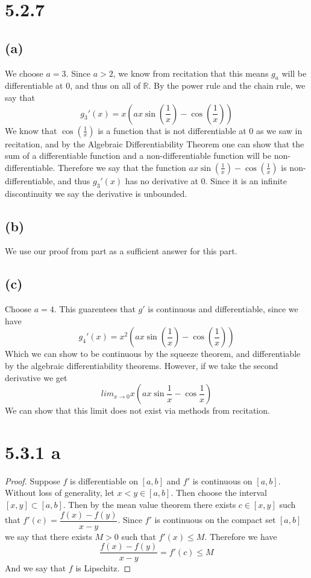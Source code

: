 \documentclass{article}
\begin{document}
\section*{5.2.7}
\subsection*{(a)}
We choose $a =3$. Since $a >2$, we know from recitation that this means $g_a$ will be differentiable at 0, and thus on all of $\mathbb{R}$. By the power rule and the chain rule, we say that 
\[ g_3'(x) = x \left(ax \sin\left(\frac{1}{x}\right) - \cos\left(\frac{1}{x}\right)\right)\]
We know that $\cos\left(\frac{1}{x}\right)$ is a function that is not differentiable at 0 as we saw in recitation, and by the Algebraic Differentiability Theorem one can show that the sum of a differentiable function and a non-differentiable function will be non-differentiable. Therefore we say that the function $ax \sin\left(\frac{1}{x}\right) - \cos\left(\frac{1}{x}\right)$ is non-differentiable, and thus $g_3'(x)$ has no derivative at 0. Since it is an infinite discontinuity we say the derivative is unbounded.
\subsection*{(b)}
We use our proof from part  as a sufficient answer for this part.
\subsection*{(c)}
Choose $a = 4$. This guarentees that $g'$ is continuous and differentiable, since we have 
\[ g_4'(x) = x^2 \left(ax \sin\left(\frac{1}{x}\right) - \cos\left(\frac{1}{x}\right)\right)\]
Which we can show to be continuous by the squeeze theorem, and differentiable by the algebraic differentiability theorems. However, if we take the second derivative we get
\[ lim_{x \rightarrow 0}x(ax\sin{\frac{1}{x}}-\cos{\frac{1}{x}}) \]
We can show that this limit does not exist via methods from recitation.
\section*{5.3.1 a}
\begin{proof}
Suppose $f$ is differentiable on $[a,b]$ and $f'$ is continuous on $[a,b]$. Without loss of generality, let $x < y \in [a,b]$. Then choose the interval $[x,y] \subset [a,b]$. Then by the mean value theorem there exists $c \in [x,y]$ such that $f'(c) = \dfrac{f(x)-f(y)}{x-y}$. Since $f'$ is continuous on the compact set $[a,b]$ we say that there exists $M>0$ such that $f'(x) \leqslant M$. Therefore we have
\[ \frac{f(x) - f(y)}{x-y} = f'(c) \leqslant M \]
And we say that $f$ is Lipschitz.
\end{proof}
\end{document}
